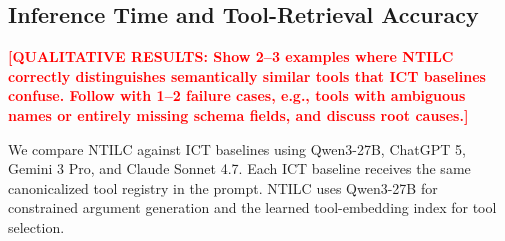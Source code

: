 \documentclass{article}
\newcommand{\placeholder}[1]{\textcolor{red}{\textbf{[#1]}}}
\begin{document}

\subsection{Inference Time and Tool-Retrieval Accuracy}

\placeholder{QUALITATIVE RESULTS: Show 2--3 examples where NTILC correctly distinguishes semantically similar tools that ICT baselines confuse. Follow with 1--2 failure cases, e.g., tools with ambiguous names or entirely missing schema fields, and discuss root causes.}

We compare NTILC against ICT baselines using Qwen3-27B, ChatGPT 5, Gemini 3 Pro, and Claude Sonnet 4.7.
Each ICT baseline receives the same canonicalized tool registry in the prompt.
NTILC uses Qwen3-27B for constrained argument generation and the learned tool-embedding index for tool selection.
\end{document}
